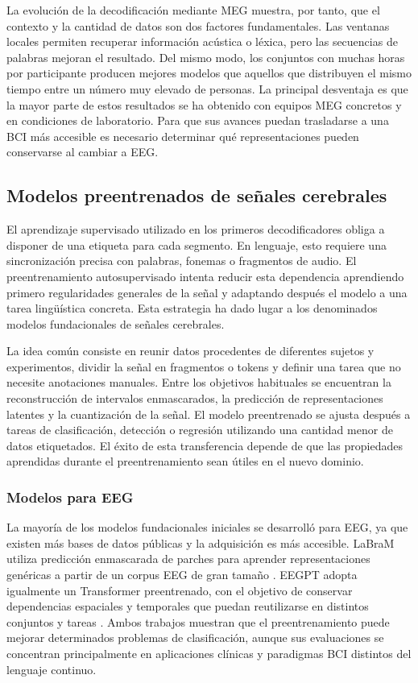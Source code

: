 La evolución de la decodificación mediante MEG muestra, por tanto, que el contexto y la cantidad de datos son dos factores fundamentales. Las ventanas locales permiten recuperar información acústica o léxica, pero las secuencias de palabras mejoran el resultado. Del mismo modo, los conjuntos con muchas horas por participante producen mejores modelos que aquellos que distribuyen el mismo tiempo entre un número muy elevado de personas. La principal desventaja es que la mayor parte de estos resultados se ha obtenido con equipos MEG concretos y en condiciones de laboratorio. Para que sus avances puedan trasladarse a una BCI más accesible es necesario determinar qué representaciones pueden conservarse al cambiar a EEG.

\subsection{Modelos preentrenados de señales cerebrales}

El aprendizaje supervisado utilizado en los primeros decodificadores obliga a disponer de una etiqueta para cada segmento. En lenguaje, esto requiere una sincronización precisa con palabras, fonemas o fragmentos de audio. El preentrenamiento autosupervisado intenta reducir esta dependencia aprendiendo primero regularidades generales de la señal y adaptando después el modelo a una tarea lingüística concreta. Esta estrategia ha dado lugar a los denominados modelos fundacionales de señales cerebrales.

La idea común consiste en reunir datos procedentes de diferentes sujetos y experimentos, dividir la señal en fragmentos o tokens y definir una tarea que no necesite anotaciones manuales. Entre los objetivos habituales se encuentran la reconstrucción de intervalos enmascarados, la predicción de representaciones latentes y la cuantización de la señal. El modelo preentrenado se ajusta después a tareas de clasificación, detección o regresión utilizando una cantidad menor de datos etiquetados. El éxito de esta transferencia depende de que las propiedades aprendidas durante el preentrenamiento sean útiles en el nuevo dominio.

\subsubsection{Modelos para EEG}

La mayoría de los modelos fundacionales iniciales se desarrolló para EEG, ya que existen más bases de datos públicas y la adquisición es más accesible. LaBraM utiliza predicción enmascarada de parches para aprender representaciones genéricas a partir de un corpus EEG de gran tamaño \cite{jiang2024labram}. EEGPT adopta igualmente un Transformer preentrenado, con el objetivo de conservar dependencias espaciales y temporales que puedan reutilizarse en distintos conjuntos y tareas \cite{wang2024eegpt}. Ambos trabajos muestran que el preentrenamiento puede mejorar determinados problemas de clasificación, aunque sus evaluaciones se concentran principalmente en aplicaciones clínicas y paradigmas BCI distintos del lenguaje continuo.

